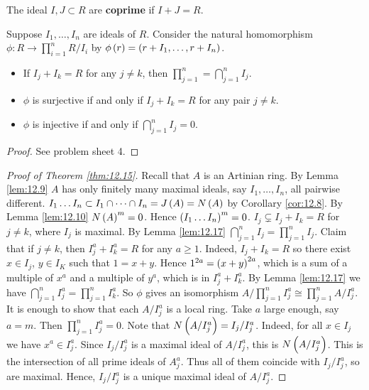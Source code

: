 \begin{definition}
The ideal $ I, J \subset R $ are \textbf{coprime} if $ I + J = R $.
\end{definition}

Suppose $ I_1, \dots, I_n $ are ideals of $ R $. Consider the natural homomorphism $ \phi : R \to \prod_{i = 1}^n R / I_i $ by $ \phi\br{r} = \br{r + I_1, \dots, r + I_n} $.

\begin{lemma}
\label{lem:12.17}
\hfill
\begin{itemize}
\item If $ I_j + I_k = R $ for any $ j \ne k $, then $ \prod_{j = 1}^n = \bigcap_{j = 1}^n I_j $.
\item $ \phi $ is surjective if and only if $ I_j + I_k = R $ for any pair $ j \ne k $.
\item $ \phi $ is injective if and only if $ \bigcap_{j = 1}^n I_j = 0 $.
\end{itemize}
\end{lemma}

\begin{proof}
See problem sheet 4.
\end{proof}

\begin{proof}[Proof of Theorem \ref{thm:12.15}]
Recall that $ A $ is an Artinian ring. By Lemma \ref{lem:12.9} $ A $ has only finitely many maximal ideals, say $ I_1, \dots, I_n $, all pairwise different. $ I_1 \dots I_n \subset I_1 \cap \dots \cap I_n = J\br{A} = N\br{A} $ by Corollary \ref{cor:12.8}. By Lemma \ref{lem:12.10} $ N\br{A}^m = 0 $. Hence $ \br{I_1 \dots I_n}^m = 0 $. $ I_j \subsetneq I_j + I_k = R $ for $ j \ne k $, where $ I_j $ is maximal. By Lemma \ref{lem:12.17} $ \bigcap_{j = 1}^n I_j = \prod_{j = 1}^n I_j $. Claim that if $ j \ne k $, then $ I_j^a + I_k^a = R $ for any $ a \ge 1 $. Indeed, $ I_j + I_k = R $ so there exist $ x \in I_j $, $ y \in I_K $ such that $ 1 = x + y $. Hence $ 1^{2a} = \br{x + y}^{2a} $, which is a sum of a multiple of $ x^a $ and a multiple of $ y^a $, which is in $ I_j^a + I_k^a $. By Lemma \ref{lem:12.17} we have $ \bigcap_{j = 1}^n I_j^a = \prod_{j = 1}^n I_k^a $. So $ \phi $ gives an isomorphism $ A / \prod_{j = 1}^n I_j^a \cong \prod_{j = 1}^n A / I_j^a $. It is enough to show that each $ A / I_j^a $ is a local ring. Take $ a $ large enough, say $ a = m $. Then $ \prod_{j = 1}^n I_j^a = 0 $. Note that $ N\br{A / I_j^a} = I_j / I_j^a $. Indeed, for all $ x \in I_j $ we have $ x^a \in I_j^a $. Since $ I_j / I_j^a $ is a maximal ideal of $ A / I_j^a $, this is $ N\br{A / I_j^a} $. This is the intersection of all prime ideals of $ A_j^a $. Thus all of them coincide with $ I_j / I_j^a $, so are maximal. Hence, $ I_j / I_j^a $ is a unique maximal ideal of $ A / I_j^a $.
\end{proof}

